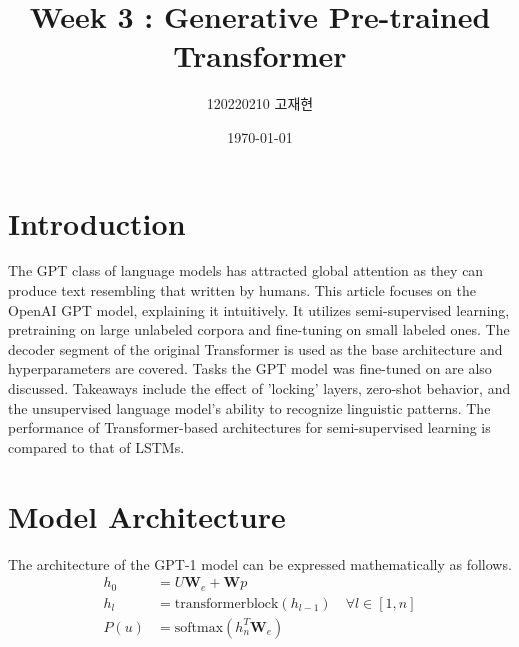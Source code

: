 \documentclass[
	11pt,
	a4paper,
	figtabcapt,
]{oblivoir}
\title{\vspace{-4cm}Week 3 : Generative Pre-trained Transformer}
\author{120220210 고재현}
\date{\today}
\begin{document}


\maketitle




\setcounter{table}{0}		                    %
\setcounter{figure}{0}		                    %



\section{Introduction}
The GPT class of language models has attracted global attention as they can produce text resembling that written by humans. This article focuses on the OpenAI GPT model, explaining it intuitively.
It utilizes semi-supervised learning, pretraining on large unlabeled corpora and fine-tuning on small labeled ones. The decoder segment of the original Transformer is used as the base architecture and hyperparameters are covered.
Tasks the GPT model was fine-tuned on are also discussed. Takeaways include the effect of 'locking' layers, zero-shot behavior, and the unsupervised language model's ability to recognize linguistic patterns.
The performance of Transformer-based\cite{NIPS2017_3f5ee243} architectures for semi-supervised learning is compared to that of LSTMs.

\section{Model Architecture}\label{sec:architecture}
The architecture of the GPT-1  model can be expressed mathematically as follows.
\begin{align}
	h_0 &= U \textbf{W}_e + \textbf{W}p \\
	h_l &= \text{transformerblock}(h_{l-1}) \quad \forall l \in [1, n] \\
	P(u) &= \text{softmax}(h_n^T \textbf{W}_e)
\end{align}
	
\end{document}
